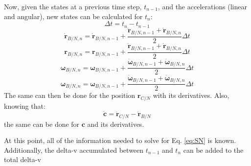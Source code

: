 Now, given the states at a previous time step, $t_{n-1}$, and the accelerations (linear and angular), new states can be calculated for $t_n$:
\begin{equation}
	\Delta t = t_{n} - t_{n-1}
\end{equation}
\begin{equation}
\dot{\bm{r}}_{B/N,n} = \dot{\bm{r}}_{B/N,n-1} + \frac{\ddot{\bm{r}}_{B/N,n-1}+\ddot{\bm{r}}_{B/N,n}}{2} \Delta t
\end{equation}
\begin{equation}
	\bm{r}_{B/N,n} = \bm{r}_{B/N,n-1} + \frac{\dot{\bm{r}}_{B/N,n-1}+\dot{\bm{r}}_{B/N,n}}{2} \Delta t
\end{equation}
\begin{equation}
\bm{\omega}_{B/N,n} = \bm{\omega}_{B/N,n-1} + \frac{\dot{\bm{\omega}}_{B/N,n-1}+\dot{\bm{\omega}}_{B/N,n}}{2} \Delta t
\end{equation}
\begin{equation}
\bm{\omega}_{B/N,n} = \bm{\omega}_{B/N,n-1} + \frac{\dot{\bm{\omega}}_{B/N,n-1}+\dot{\bm{\omega}}_{B/N,n}}{2} \Delta t
\end{equation}	
The same can then be done for the position $ {\bm{r}}_{C/N}$ with its derivatives. Also, knowing that:
\begin{equation}
\ddot{\bm{c}} = \ddot{\bm{r}}_{C/N} - \ddot{\bm{r}}_{B/N}
\end{equation}
the same can be done for $\bm{c}$ and its derivatives. 

At this point, all of the information needed to solve for Eq. \ref{eq:SN} is known. Additionally, the delta-v accumulated between $t_{n-1}$ and $t_{n}$ can be added to the total delta-v

